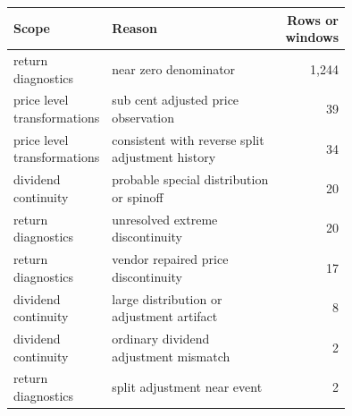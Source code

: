 {\small
\begin{tabular}{@{}p{0.15\linewidth}p{0.60\linewidth}r@{}}
\toprule
Scope & Reason & Rows or windows \\
\midrule
return diagnostics & near zero denominator & 1,244 \\
price level transformations & sub cent adjusted price observation & 39 \\
price level transformations & consistent with reverse split adjustment history & 34 \\
dividend continuity & probable special distribution or spinoff & 20 \\
return diagnostics & unresolved extreme discontinuity & 20 \\
return diagnostics & vendor repaired price discontinuity & 17 \\
dividend continuity & large distribution or adjustment artifact & 8 \\
dividend continuity & ordinary dividend adjustment mismatch & 2 \\
return diagnostics & split adjustment near event & 2 \\
\bottomrule
\end{tabular}
}

